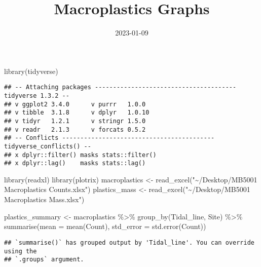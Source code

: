 \documentclass[
]{article}
\title{Macroplastics Graphs}
\author{}
\date{\vspace{-2.5em}2023-01-09}
\newenvironment{Shaded}{\begin{snugshade}}{\end{snugshade}}
\newcommand{\AttributeTok}[1]{\textcolor[rgb]{0.77,0.63,0.00}{#1}}
\newcommand{\FunctionTok}[1]{\textcolor[rgb]{0.00,0.00,0.00}{#1}}
\newcommand{\NormalTok}[1]{#1}
\newcommand{\OtherTok}[1]{\textcolor[rgb]{0.56,0.35,0.01}{#1}}
\newcommand{\SpecialCharTok}[1]{\textcolor[rgb]{0.00,0.00,0.00}{#1}}
\newcommand{\StringTok}[1]{\textcolor[rgb]{0.31,0.60,0.02}{#1}}
\begin{document}
\maketitle

\begin{Shaded}
\begin{Highlighting}[]
\FunctionTok{library}\NormalTok{(tidyverse)}
\end{Highlighting}
\end{Shaded}

\begin{verbatim}
## -- Attaching packages --------------------------------------- tidyverse 1.3.2 --
## v ggplot2 3.4.0      v purrr   1.0.0 
## v tibble  3.1.8      v dplyr   1.0.10
## v tidyr   1.2.1      v stringr 1.5.0 
## v readr   2.1.3      v forcats 0.5.2 
## -- Conflicts ------------------------------------------ tidyverse_conflicts() --
## x dplyr::filter() masks stats::filter()
## x dplyr::lag()    masks stats::lag()
\end{verbatim}

\begin{Shaded}
\begin{Highlighting}[]
\FunctionTok{library}\NormalTok{(readxl)}
\FunctionTok{library}\NormalTok{(plotrix)}
\NormalTok{macroplastics }\OtherTok{\textless{}{-}} \FunctionTok{read\_excel}\NormalTok{(}\StringTok{"\textasciitilde{}/Desktop/MB5001 Macroplastics Counts.xlsx"}\NormalTok{)}
\NormalTok{plastics\_mass }\OtherTok{\textless{}{-}} \FunctionTok{read\_excel}\NormalTok{(}\StringTok{"\textasciitilde{}/Desktop/MB5001 Macroplastics Mass.xlsx"}\NormalTok{)}
\end{Highlighting}
\end{Shaded}

\begin{Shaded}
\begin{Highlighting}[]
\NormalTok{plastics\_summary }\OtherTok{\textless{}{-}}\NormalTok{ macroplastics }\SpecialCharTok{\%\textgreater{}\%} 
  \FunctionTok{group\_by}\NormalTok{(Tidal\_line, Site) }\SpecialCharTok{\%\textgreater{}\%} 
  \FunctionTok{summarise}\NormalTok{(}\AttributeTok{mean =} \FunctionTok{mean}\NormalTok{(Count), }\AttributeTok{std\_error =} \FunctionTok{std.error}\NormalTok{(Count))}
\end{Highlighting}
\end{Shaded}

\begin{verbatim}
## `summarise()` has grouped output by 'Tidal_line'. You can override using the
## `.groups` argument.
\end{verbatim}
\end{document}
